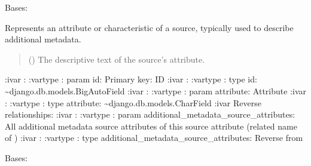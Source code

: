 \documentclass[letterpaper,10pt,english]{sphinxmanual}
\begin{document}
\begin{fulllineitems}
\label{\detokenize{source/meta_models_management:meta_models_management.models.SourceAttribute}}
\pysigstartsignatures
{}
\pysigstopsignatures
\sphinxAtStartPar
Bases: 

\sphinxAtStartPar
Represents an attribute or characteristic of a source, typically used to describe additional metadata.
\begin{quote}\begin{description}
\sphinxAtStartPar
{} () \textendash{} The descriptive text of the source’s attribute.

\end{description}\end{quote}

\sphinxAtStartPar
:ivar : 
:vartype : param id: Primary key: ID
:ivar : 
:vartype : type id: \textasciitilde{}django.db.models.BigAutoField
:ivar : 
:vartype : param attribute: Attribute
:ivar :
:vartype : type attribute: \textasciitilde{}django.db.models.CharField
:ivar Reverse relationships:
:ivar : 
:vartype : param additional\_metadata\_source\_attributes: All additional metadata source attributes of this source attribute (related name of )
:ivar : 
:vartype : type additional\_metadata\_source\_attributes: Reverse  from {\hyperref[\detokenize{source/meta_models_management:meta_models_management.models.AdditionalMetadata}]{}}

\begin{fulllineitems}
\label{\detokenize{source/meta_models_management:meta_models_management.models.SourceAttribute.DoesNotExist}}
\pysigstartsignatures
{}
\pysigstopsignatures
\sphinxAtStartPar
Bases: 


\end{fulllineitems}
\end{fulllineitems}
\end{document}
